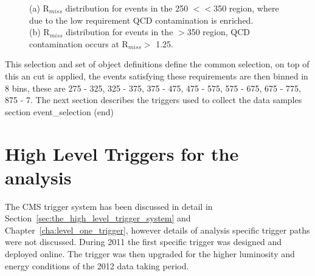 \begin{figure}[htbp]
  \centering
\caption{(a) R$_{miss}$ distribution for events in the \unit{250}{\GeV} 
$<$\HT$<$\unit{350}{\GeV} region, where due to the low \HT requirement QCD 
contamination is enriched. \\ (b) R$_{miss}$ distribution for events in the 
\HT$>$\unit{350}{\GeV} region, QCD contamination occurs at R$_{miss} >$ 1.25.}
\label{fig:MHTovMET_lowHT_highHT}
\end{figure}


This selection and set of object definitions define the common selection, on 
top of this an \alt cut is applied, the events satisfying these requirements 
are then binned in 8 \HT bins, these are \unit{275}{\GeV} - \unit{325}{\GeV}, 
\unit{325}{\GeV} - \unit{375}{\GeV}, \unit{375}{\GeV} - \unit{475}{\GeV}, 
\unit{475}{\GeV} - \unit{575}{\GeV}, \unit{575}{\GeV} - \unit{675}{\GeV}, 
\unit{675}{\GeV} - \unit{775}{\GeV}, \unit{875}{\GeV} - \unit{7}{\TeV}.
The next section describes the triggers used to collect the data samples
section event_selection (end)

\section{High Level Triggers for the \alt analysis} %
\label{sec:high_level_triggers_for_the_alt_analysis}
The CMS trigger system has been discussed in detail in 
Section~\ref{sec:the_high_level_trigger_system} and 
Chapter~\ref{cha:level_one_trigger}, however details of analysis specific 
trigger paths were not discussed. During 2011 the first \alt specific trigger 
was designed and deployed online. The trigger was then upgraded for the higher 
luminosity and energy conditions of the 2012 data taking period.


